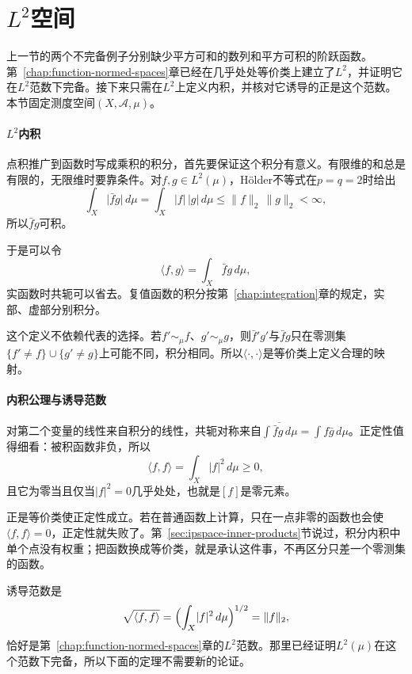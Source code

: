 \section{\texorpdfstring{$L^2$}{L2}空间}
\label{sec:ipspace-l2-space}

上一节的两个不完备例子分别缺少平方可和的数列和平方可积的阶跃函数。第~\ref{chap:function-normed-spaces}章已经在几乎处处等价类上建立了$L^2$，并证明它在$L^2$范数下完备。接下来只需在$L^2$上定义内积，并核对它诱导的正是这个范数。本节固定测度空间$(X,\mathcal A,\mu)$。

\paragraph{\texorpdfstring{$L^2$}{L2}内积}
点积推广到函数时写成乘积的积分，首先要保证这个积分有意义。有限维的和总是有限的，无限维时要靠条件。对$f,g\in L^2(\mu)$，Hölder不等式在$p=q=2$时给出
\[
 \int_X\lvert\bar fg\rvert\,d\mu=\int_X\lvert f\rvert\,\lvert g\rvert\,d\mu\leq\lVert f\rVert_2\,\lVert g\rVert_2<\infty,
\]
所以$\bar fg$可积。

于是可以令
\begin{equation}
 \langle f,g\rangle=\int_X\bar fg\,d\mu ,
 \label{eq:ipspace-l2-inner-product}
\end{equation}
实函数时共轭可以省去。复值函数的积分按第~\ref{chap:integration}章的规定，实部、虚部分别积分。

这个定义不依赖代表的选择。若$f'\sim_\mu f$、$g'\sim_\mu g$，则$\bar f'g'$与$\bar fg$只在零测集$\{f'\neq f\}\cup\{g'\neq g\}$上可能不同，积分相同。所以$\langle\cdot,\cdot\rangle$是等价类上定义合理的映射。

\paragraph{内积公理与诱导范数}
对第二个变量的线性来自积分的线性，共轭对称来自$\overline{\int\bar fg\,d\mu}=\int f\bar g\,d\mu$。正定性值得细看：被积函数非负，所以
\[
 \langle f,f\rangle=\int_X\lvert f\rvert^2\,d\mu\geq0 ,
\]
且它为零当且仅当$\lvert f\rvert^2=0$几乎处处，也就是$[f]$是零元素。

正是等价类使正定性成立。若在普通函数上计算，只在一点非零的函数也会使$\langle f,f\rangle=0$，正定性就失败了。第~\ref{sec:ipspace-inner-products}节说过，积分内积中单个点没有权重；把函数换成等价类，就是承认这件事，不再区分只差一个零测集的函数。

诱导范数是
\[
 \sqrt{\langle f,f\rangle}=\Bigl(\int_X\lvert f\rvert^2\,d\mu\Bigr)^{1/2}=\lVert f\rVert_2 ,
\]
恰好是第~\ref{chap:function-normed-spaces}章的$L^2$范数。那里已经证明$L^2(\mu)$在这个范数下完备，所以下面的定理不需要新的论证。

